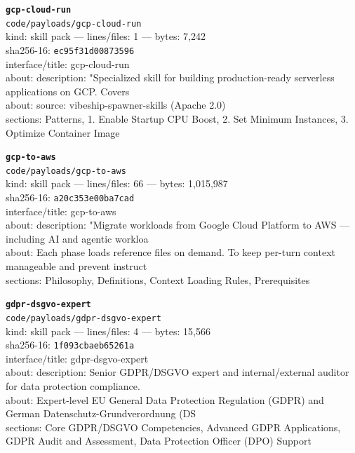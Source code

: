 \noindent\textbf{\texttt{gcp-cloud-run}}\\
\texttt{code/payloads/gcp-cloud-run}\\
kind: skill pack --- lines/files: 1 --- bytes: 7,242\\
sha256-16: \texttt{ec95f31d00873596}\\
interface/title: gcp-cloud-run\\
about: description: "Specialized skill for building production-ready serverless applications on GCP. Covers\\
about: source: vibeship-spawner-skills (Apache 2.0)\\
sections: Patterns, 1. Enable Startup CPU Boost, 2. Set Minimum Instances, 3. Optimize Container Image\\
\vspace*{6.0pt}

\noindent\textbf{\texttt{gcp-to-aws}}\\
\texttt{code/payloads/gcp-to-aws}\\
kind: skill pack --- lines/files: 66 --- bytes: 1,015,987\\
sha256-16: \texttt{a20c353e00ba7cad}\\
interface/title: gcp-to-aws\\
about: description: "Migrate workloads from Google Cloud Platform to AWS — including AI and agentic workloa\\
about: Each phase loads reference files on demand. To keep per-turn context manageable and prevent instruct\\
sections: Philosophy, Definitions, Context Loading Rules, Prerequisites\\
\vspace*{6.0pt}

\noindent\textbf{\texttt{gdpr-dsgvo-expert}}\\
\texttt{code/payloads/gdpr-dsgvo-expert}\\
kind: skill pack --- lines/files: 4 --- bytes: 15,566\\
sha256-16: \texttt{1f093cbaeb65261a}\\
interface/title: gdpr-dsgvo-expert\\
about: description: Senior GDPR/DSGVO expert and internal/external auditor for data protection compliance. \\
about: Expert-level EU General Data Protection Regulation (GDPR) and German Datenschutz-Grundverordnung (DS\\
sections: Core GDPR/DSGVO Competencies, Advanced GDPR Applications, GDPR Audit and Assessment, Data Protection Officer (DPO) Support\\
\vspace*{6.0pt}
\newpage

